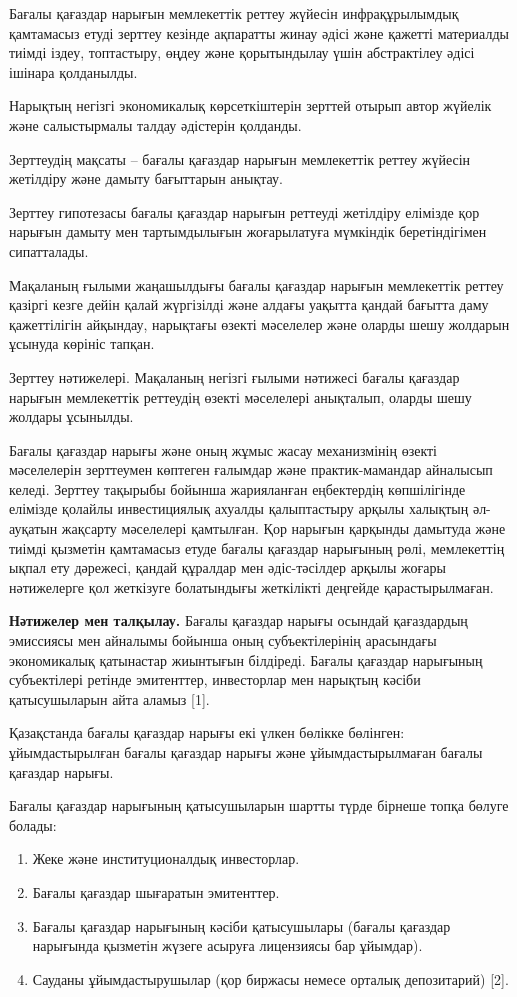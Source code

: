 Бағалы қағаздар нарығын мемлекеттік реттеу жүйесін инфрақұрылымдық
қамтамасыз етуді зерттеу кезінде ақпаратты жинау әдісі және қажетті
материалды тиімді іздеу, топтастыру, өңдеу және қорытындылау үшін
абстрактілеу әдісі ішінара қолданылды.

Нарықтың негізгі экономикалық көрсеткіштерін зерттей отырып автор
жүйелік және салыстырмалы талдау әдістерін қолданды.

Зерттеудің мақсаты -- бағалы қағаздар нарығын мемлекеттік реттеу жүйесін
жетілдіру және дамыту бағыттарын анықтау.

Зерттеу гипотезасы бағалы қағаздар нарығын реттеуді жетілдіру елімізде
қор нарығын дамыту мен тартымдылығын жоғарылатуға мүмкіндік
беретіндігімен сипатталады.

Мақаланың ғылыми жаңашылдығы бағалы қағаздар нарығын мемлекеттік реттеу
қазіргі кезге дейін қалай жүргізілді және алдағы уақытта қандай бағытта
даму қажеттілігін айқындау, нарықтағы өзекті мәселелер және оларды шешу
жолдарын ұсынуда көрініс тапқан.

Зерттеу нәтижелері. Мақаланың негізгі ғылыми нәтижесі бағалы қағаздар
нарығын мемлекеттік реттеудің өзекті мәселелері анықталып, оларды шешу
жолдары ұсынылды.

Бағалы қағаздар нарығы және оның жұмыс жасау механизмінің өзекті
мәселелерін зерттеумен көптеген ғалымдар және практик-мамандар айналысып
келеді. Зерттеу тақырыбы бойынша жарияланған еңбектердің көпшілігінде
елімізде қолайлы инвестициялық ахуалды қалыптастыру арқылы халықтың
әл-ауқатын жақсарту мәселелері қамтылған. Қор нарығын қарқынды дамытуда
және тиімді қызметін қамтамасыз етуде бағалы қағаздар нарығының рөлі,
мемлекеттің ықпал ету дәрежесі, қандай құралдар мен әдіс-тәсілдер арқылы
жоғары нәтижелерге қол жеткізуге болатындығы жеткілікті деңгейде
қарастырылмаған.

{\bfseries Нәтижелер мен талқылау.} Бағалы қағаздар нарығы осындай
қағаздардың эмиссиясы мен айналымы бойынша оның субъектілерінің
арасындағы экономикалық қатынастар жиынтығын білдіреді. Бағалы қағаздар
нарығының субъектілері ретінде эмитенттер, инвесторлар мен нарықтың
кәсіби қатысушыларын айта аламыз {[}1{]}.

Қазақстанда бағалы қағаздар нарығы екі үлкен бөлікке бөлінген:
ұйымдастырылған бағалы қағаздар нарығы және ұйымдастырылмаған бағалы
қағаздар нарығы.

Бағалы қағаздар нарығының қатысушыларын шартты түрде бірнеше топқа
бөлуге болады:

\begin{enumerate}
\def\labelenumi{\arabic{enumi}.}
\item
  Жеке және институционалдық инвесторлар.
\item
  Бағалы қағаздар шығаратын эмитенттер.
\item
  Бағалы қағаздар нарығының кәсіби қатысушылары (бағалы қағаздар
  нарығында қызметін жүзеге асыруға лицензиясы бар ұйымдар).
\item
  Сауданы ұйымдастырушылар (қор биржасы немесе орталық депозитарий)
  {[}2{]}.
\end{enumerate}

